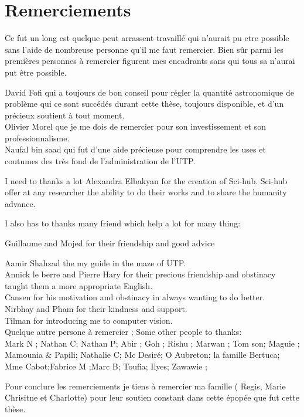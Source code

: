 \documentclass[english]{spimubphdthesis}
\begin{document}
\chapter*{Remerciements}
Ce fut un long est quelque peut arrassent travaillé qui n'aurait pu etre possible sans l'aide de nombreuse personne  qu'il me faut remercier.
Bien sûr parmi les premières personnes à remercier figurent mes encadrants sans qui tous sa n'aurai put être possible.

David Fofi qui a toujours de bon conseil pour régler la quantité astronomique de problème qui ce sont succédés durant cette thèse, toujours disponible, et d'un précieux soutient à tout moment.  \\
Olivier Morel que je me dois de remercier pour son investissement et son professionnalisme.\\
Naufal bin saad qui fut d'une aide précieuse  pour comprendre  les uses et coutumes des très fond de l'administration de l'UTP.

I need to thanks a lot Alexandra Elbakyan for the  creation  of Sci-hub. Sci-hub  offer at any researcher the ability to do their works and to share the humanity advance.

I also has to  thanks many friend which help a lot for many thing:

Guillaume and Mojed  for their friendship and good advice

Aamir Shahzad the my guide in the maze of UTP.\\
Annick le berre and Pierre Hary  for their precious friendship and obstinacy taught them a more appropriate English.\\
Cansen for his motivation and obstinacy in always wanting to do better.\\
Nirbhay and Pham  for their kindness and support.\\
Tilman for introducing me to computer vision.\\

Quelque autre persone à remercier ; Some other people to thanks:\\ 
  Mark N ; Nathan C; Nathan P; Abir ; Goh ; Rishu ; Marwan ; Tom son; Maguie ; Mamounia \& Papili; Nathalie C; Mc Desiré; O Aubreton; la famille Bertuca; Mme Cabot;Fabrice M ;Marc B; Toufia; Ilyes; Zawawie ; 



Pour conclure  les remerciements  je tiens à remercier  ma famille ( Regis, Marie Chrisitne et Charlotte) pour leur soutien constant dans cette épopée que fut cette  thèse.  
\tableofcontents
\end{document}
